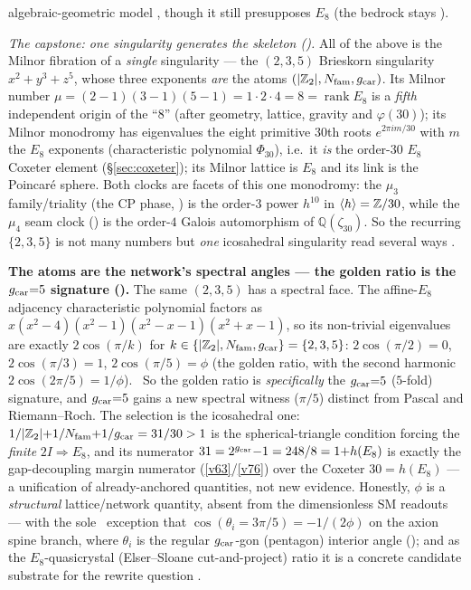 \begin{keybox}
algebraic-geometric model \mC, though it still presupposes $E_8$ (the bedrock stays \mO).
\par\smallskip\noindent\emph{The capstone: one singularity generates the skeleton
().} All of the above is the Milnor fibration of a \emph{single}
singularity --- the $(2,3,5)$ Brieskorn singularity $x^2+y^3+z^5$, whose three exponents \emph{are} the atoms
$(|\mathbb Z_2|,N_{\mathrm{fam}},g_{\mathrm{car}})$. Its Milnor number $\mu=(2{-}1)(3{-}1)(5{-}1)=1{\cdot}2{\cdot}4=8=\operatorname{rank}E_8$
is a \emph{fifth} independent origin of the ``$8$'' (after geometry, lattice, gravity and $\varphi(30)$);
its Milnor monodromy has eigenvalues the eight primitive $30$th roots $e^{2\pi i m/30}$ with $m$ the $E_8$
exponents (characteristic polynomial $\Phi_{30}$), i.e.\ it \emph{is} the order-$30$ $E_8$ Coxeter element
(\S\ref{sec:coxeter}); its Milnor lattice is $E_8$ and its link is the Poincar\'e sphere. Both clocks are
facets of this one monodromy: the $\mu_3$ family/triality (the CP phase, )
is the order-$3$ power $h^{10}$ in $\langle h\rangle=\mathbb Z/30$, while the $\mu_4$ seam clock
() is the order-$4$ Galois automorphism of $\mathbb Q(\zeta_{30})$. So the
recurring $\{2,3,5\}$ is not many numbers but \emph{one} icosahedral singularity read several ways \mE.
\end{keybox}

\par\smallskip\noindent\textbf{The atoms are the network's spectral angles --- the golden ratio is the
$g_{\mathrm{car}}{=}5$ signature ().} The same $(2,3,5)$ has a spectral face. The
affine-$E_8$ adjacency characteristic polynomial factors as $x(x^2{-}4)(x^2{-}1)(x^2{-}x{-}1)(x^2{+}x{-}1)$, so its
non-trivial eigenvalues are exactly $2\cos(\pi/k)$ for $k\in\{|\mathbb Z_2|,N_{\mathrm{fam}},g_{\mathrm{car}}\}=\{2,3,5\}$: $2\cos(\pi/2){=}0$,
$2\cos(\pi/3){=}1$, $2\cos(\pi/5){=}\phi$ (the golden ratio, with the second harmonic $2\cos(2\pi/5){=}1/\phi$).
\mE\ So the golden ratio is \emph{specifically} the $g_{\mathrm{car}}{=}5$ ($5$-fold) signature, and $g_{\mathrm{car}}{=}5$ gains a new
spectral witness ($\pi/5$) distinct from Pascal and Riemann--Roch. The selection is the icosahedral one:
$1/|\mathbb Z_2|{+}1/N_{\mathrm{fam}}{+}1/g_{\mathrm{car}}=31/30>1$ is the spherical-triangle condition forcing the \emph{finite}
$2I\Rightarrow E_8$, and its numerator $31=2^{g_{\mathrm{car}}}{-}1=248/8=1{+}h(E_8)$ is exactly the gap-decoupling margin
numerator (\vref{v63}/\vref{v76}) over the Coxeter $30=h(E_8)$ --- a unification of already-anchored quantities,
not new evidence. Honestly, $\phi$ is a \emph{structural} lattice/network quantity, absent from the dimensionless
SM readouts --- with the sole \mC\ exception that $\cos(\theta_i{=}3\pi/5)=-1/(2\phi)$ on the axion spine branch,
where $\theta_i$ is the regular $g_{\mathrm{car}}$-gon (pentagon) interior angle (); and
as the $E_8$-quasicrystal (Elser--Sloane cut-and-project) ratio it is a concrete candidate substrate
for the rewrite question \mC.

